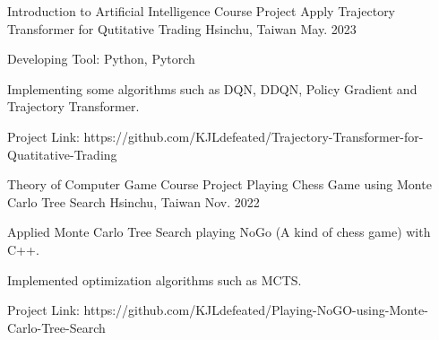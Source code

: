 

\begin{cventries}

  \cventry
    {Introduction to Artificial Intelligence Course Project} 
    {Apply Trajectory Transformer for Qutitative Trading} 
    {Hsinchu, Taiwan} 
    {May. 2023} 
    {
      \begin{cvitems} %
        \item {Developing Tool: Python, Pytorch}
        \item {Implementing some algorithms such as DQN, DDQN, Policy Gradient and Trajectory Transformer.}
        \item {Project Link: https://github.com/KJLdefeated/Trajectory-Transformer-for-Quatitative-Trading}
      \end{cvitems}
    }

  \cventry
    {Theory of Computer Game Course Project}
    {Playing Chess Game using Monte Carlo Tree Search} 
    {Hsinchu, Taiwan} 
    {Nov. 2022} 
    {
      \begin{cvitems} %
        \item {Applied Monte Carlo Tree Search playing NoGo (A kind of chess game) with C++.}
        \item {Implemented optimization algorithms such as MCTS.}
        \item {Project Link: https://github.com/KJLdefeated/Playing-NoGO-using-Monte-Carlo-Tree-Search}
      \end{cvitems}
    }


\end{cventries}
